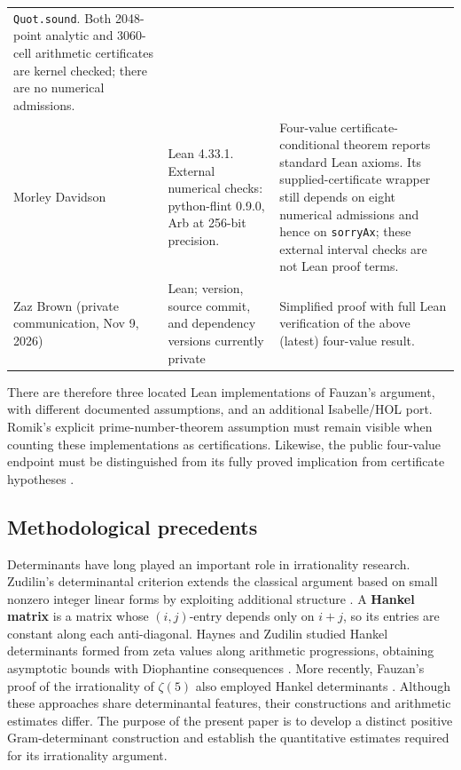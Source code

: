 \documentclass[11pt,letterpaper]{article}
\theoremstyle{definition}
\begin{document}
\begin{longtable}{@{}>{\raggedright\arraybackslash}p{}>{\raggedright\arraybackslash}p{}>{\raggedright\arraybackslash}p{}@{}}
\texttt{Quot.sound}. Both 2048-point analytic and 3060-cell arithmetic
certificates are kernel checked; there are no numerical admissions.\\
Morley Davidson \cite{davidson2026} & Lean 4.33.1.  External numerical
checks: python-flint 0.9.0, Arb at 256-bit precision. & Four-value
certificate-conditional theorem reports standard Lean axioms.  Its
supplied-certificate wrapper still depends on eight numerical
admissions and hence on \texttt{sorryAx}; these external interval checks
are not Lean proof terms.\\
Zaz Brown (private communication, Nov 9, 2026) & Lean; version, source commit,
and dependency versions currently private & Simplified proof with full Lean verification of the above (latest) four-value result.
\end{longtable}
\endgroup

There are therefore three located Lean implementations of Fauzan's
argument, with different documented assumptions, and an additional
Isabelle/HOL port.  Romik's explicit prime-number-theorem assumption
must remain visible when counting these implementations as
certifications.  Likewise, the public four-value endpoint
must be distinguished from its fully proved implication from
certificate hypotheses \cite{davidson2026}.

\subsection{Methodological precedents}

Determinants have long played an important role in irrationality research. Zudilin's determinantal criterion extends the classical argument based on small nonzero integer linear forms by exploiting additional structure \cite{zudilin2017}. A \textbf{Hankel matrix} is a matrix whose \((i,j)\)-entry depends only on \(i+j\), so its entries are constant along each anti-diagonal. Haynes and Zudilin studied Hankel determinants formed from zeta values along arithmetic progressions, obtaining asymptotic bounds with Diophantine consequences \cite{hayneszudilin2015}. More recently, Fauzan's proof of the irrationality of \(\zeta(5)\) also employed Hankel determinants \cite{fauzan2026}. Although these approaches share determinantal features, their constructions and arithmetic estimates differ. The purpose of the present paper is to develop a distinct positive Gram-determinant construction and establish the quantitative estimates required for its irrationality argument.
\end{document}
